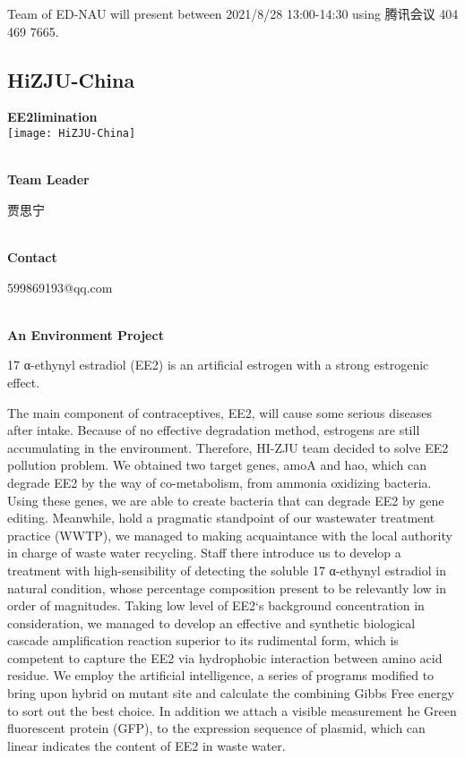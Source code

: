 Team of ED-NAU will present between      2021/8/28 13:00-14:30   using 腾讯会议 404 469 7665.
\newpage


\subsection{\textcolor{Blu}{ HiZJU-China } }
\vspace{5mm}
\begin{center}
\large{
  \textbf{ EE2limination }\\

  \texttt{[image: HiZJU-China]}
}
\end{center}
\textbf{\\Team Leader}

  贾思宁


\textbf{\\Contact}

  599869193@qq.com

\textbf{\\An Environment Project\\}\begin{spacing}{1.5}

17 α-ethynyl estradiol (EE2) is an artificial estrogen with a strong estrogenic effect.

The main component of contraceptives, EE2, will cause some serious diseases after intake. Because of no effective degradation method, estrogens are still accumulating in the environment. Therefore, HI-ZJU team decided to solve EE2 pollution problem. We obtained two target genes, amoA and hao, which can degrade EE2 by the way of co-metabolism, from ammonia oxidizing bacteria. Using these genes, we are able to create bacteria that can degrade EE2 by gene editing. Meanwhile, hold a pragmatic standpoint of our wastewater treatment practice (WWTP), we managed to making acquaintance with the local authority in charge of waste water recycling. Staff there introduce us to develop a treatment with high-sensibility of detecting the soluble 17 α-ethynyl estradiol in natural condition, whose percentage composition present to be relevantly low in order of magnitudes. Taking low level of EE2‘s background concentration in consideration, we managed to develop an effective and synthetic biological cascade amplification reaction superior to its rudimental form, which is competent to capture the EE2 via hydrophobic interaction between amino acid residue. We employ the artificial intelligence, a series of programs modified to bring upon hybrid on mutant site and calculate the combining Gibbs Free energy to sort out the best choice. In addition we attach a visible measurement he Green fluorescent protein (GFP), to the expression sequence of plasmid, which can linear indicates the content of EE2 in waste water.\end{spacing}
\\

